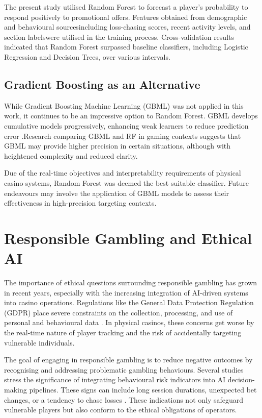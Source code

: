 \documentclass[12pt,a4paper]{report}
\begin{document}
The present study utilised Random Forest to forecast a player's probability to respond positively to promotional offers.  Features obtained from demographic and behavioural sourcesincluding loss-chasing scores, recent activity levels, and section labelswere utilised in the training process.  Cross-validation results indicated that Random Forest surpassed baseline classifiers, including Logistic Regression and Decision Trees, over various intervals.

\subsection{Gradient Boosting as an Alternative}

While Gradient Boosting Machine Learning (GBML) was not applied in this work, it continues to be an impressive option to Random Forest.  GBML develops cumulative models progressively, enhancing weak learners to reduce prediction error \citep{Omike2022b}.Research comparing GBML and RF in gaming contexts suggests that GBML may provide higher precision in certain situations, although with heightened complexity and reduced clarity.

Due of the real-time objectives and interpretability requirements of physical casino systems, Random Forest was deemed the best suitable classifier.  Future endeavours may involve the application of GBML models to assess their effectiveness in high-precision targeting contexts.

\section{Responsible Gambling and Ethical AI}

The importance of ethical questions surrounding responsible gambling has grown in recent years, especially with the increasing integration of AI-driven systems into casino operations.  Regulations like the General Data Protection Regulation (GDPR) place severe constraints on the collection, processing, and use of personal and behavioural data \citep{gdpr2016}. In physical casinos, these concerns get worse by the real-time nature of player tracking and the risk of accidentally targeting vulnerable individuals.

The goal of engaging in responsible gambling is to reduce negative outcomes by recognising and addressing problematic gambling behaviours.  Several studies stress the significance of integrating behavioural risk indicators into AI decision-making pipelines. These signs can include long session durations, unexpected bet changes, or a tendency to chase losses \citep{Ladouceur2016, Priyadarshini2022}. These indications not only safeguard vulnerable players but also conform to the ethical obligations of operators.
\end{document}
